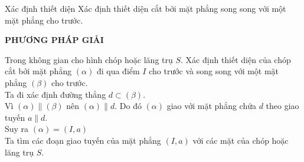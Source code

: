 \begin{dang}{Xác định thiết diện}
Xác định thiết diện cắt bởi mặt phẳng song song với một mặt phẳng cho trước.
\end{dang}
\begin{center}
	\textbf{PHƯƠNG PHÁP GIẢI}
\end{center}
Trong không gian cho hình chóp hoặc lăng trụ $S$. Xác định thiết diện của chóp cắt bởi mặt phẳng $(\alpha)$ đi qua điểm $I$ cho trước và song song với một mặt phẳng $(\beta)$ cho trước.\\
Ta đi xác định đường thẳng $d \subset (\beta)$.\\
Vì $(\alpha) \parallel (\beta)$ nên $(\alpha) \parallel d$. Do đó $(\alpha)$ giao với mặt phẳng chứa $d$ theo giao tuyến $a \parallel d$.\\ Suy ra $(\alpha) = (I,a)$\\
Ta tìm các đoạn giao tuyến của mặt phẳng $(I,a)$ với các mặt của chóp hoặc lăng trụ $S$.
